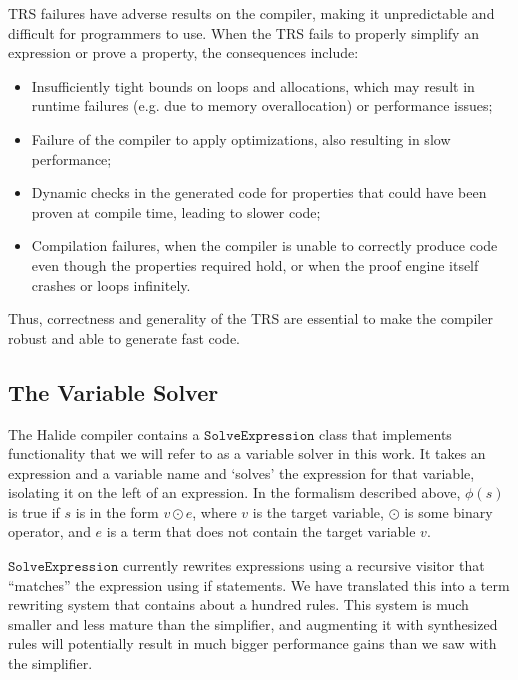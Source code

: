 TRS failures have adverse results on the compiler, making it unpredictable and
  difficult for programmers to use.  When the TRS fails to properly simplify an expression or
  prove a property, the consequences include: 
\begin{itemize}
\item Insufficiently tight bounds on loops and allocations, which may result in
  runtime failures (e.g. due to memory overallocation) or performance issues;

\item Failure of the compiler to apply optimizations, also resulting in slow performance;

\item Dynamic checks in the generated code for properties that could have been proven
  at compile time, leading to slower code;

\item Compilation failures, when the compiler is unable to correctly produce code
  even though the properties required hold, or when the proof engine itself crashes
  or loops infinitely.
\end{itemize}

Thus, correctness and generality of the TRS are essential to make the compiler
robust and able to generate fast code.

\subsection{The Variable Solver}

The Halide compiler contains a $\texttt{SolveExpression}$ class that implements functionality that we will refer to as a variable solver in this work. It takes an expression and a variable name and `solves' the expression for that variable, isolating it on the left of an expression. In the formalism described above, $\phi(s)$ is true if $s$ is in the form $v \odot e$, where $v$ is the target variable, $\odot$ is some binary operator, and $e$ is a term that does not contain the target variable $v$.

$\texttt{SolveExpression}$ currently rewrites expressions using a recursive visitor that ``matches'' the expression using if statements. We have translated this into a term rewriting system that contains about a hundred rules. This system is much smaller and less mature than the simplifier, and augmenting it with synthesized rules will potentially result in much bigger performance gains than we saw with the simplifier.

